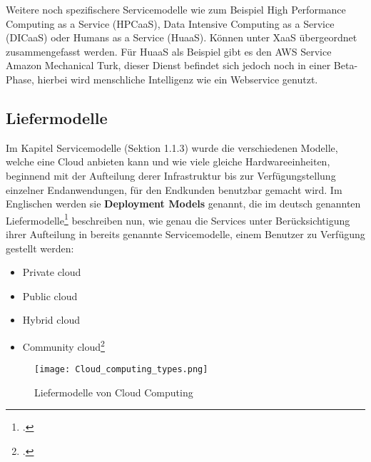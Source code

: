 Weitere noch spezifischere Servicemodelle wie zum Beispiel High Performance Computing as a Service (HPCaaS), Data Intensive Computing as a Service (DICaaS) oder Humans as a Service (HuaaS). Können unter XaaS übergeordnet zusammengefasst werden. Für HuaaS als Beispiel gibt es den AWS Service Amazon Mechanical Turk, dieser Dienst befindet sich jedoch noch in einer Beta-Phase, hierbei wird menschliche Intelligenz wie ein Webservice genutzt.

\subsection{Liefermodelle}
Im Kapitel Servicemodelle (Sektion 1.1.3) wurde die verschiedenen Modelle, welche eine Cloud anbieten kann und wie viele gleiche Hardwareeinheiten, beginnend mit der Aufteilung derer Infrastruktur bis zur Verfügungstellung einzelner Endanwendungen, für den Endkunden benutzbar gemacht wird.\newline
Im Englischen werden sie \textbf{Deployment Models} genannt, die im deutsch genannten Liefermodelle\footcite{Lehrunterlagen-HTL-cloud} beschreiben nun, wie genau die Services unter Berücksichtigung ihrer Aufteilung in bereits genannte Servicemodelle, einem Benutzer zu Verfügung gestellt werden:
\begin{itemize}
	\item Private cloud
	\item Public cloud
	\item Hybrid cloud
	\item Community cloud\footcite{cloud-types-pic}
\end{itemize}

\begin{center}
\begin{figure}[h]
    \centering
    \texttt{[image: Cloud\_computing\_types.png]}
    \caption{Liefermodelle von Cloud Computing}
\end{figure}
\end{center}

